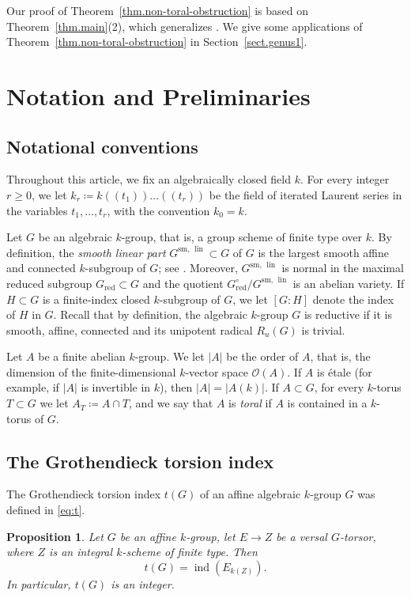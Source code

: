 \documentclass[12pt]{amsart}
\numberwithin{equation}{section}
\newtheorem{proposition}[theorem]{Proposition}
\theoremstyle{remark}
\newcommand{\lin}{\operatorname{lin}}
\newcommand{\Glin}{G^{\mathrm{sm}, \, \lin}}
\begin{document}
Our proof of Theorem~\ref{thm.non-toral-obstruction} is based on Theorem~\ref{thm.main}(2), which generalizes \cite[Proposition 2.1]{genus1}. We give some applications of Theorem~\ref{thm.non-toral-obstruction} in Section~\ref{sect.genus1}.


\section{Notation and Preliminaries}
\label{sect.prelim} 

\subsection{Notational conventions}
\label{subsect.notation}
Throughout this article, we fix an algebraically closed field $k$. For every integer $r\geqslant 0$, we let $k_r \coloneqq k(\!(t_1)\!)\dots (\!(t_r)\!)$ be the field of iterated Laurent series in the variables $t_1, \ldots, t_r$, with the convention $k_0=k$.

Let $G$ be an algebraic $k$-group, that is, a group scheme of finite type over $k$. By definition, the \emph{smooth linear part} $\Glin\subset G$ of $G$ is the largest smooth affine and connected $k$-subgroup of $G$; see \cite[Section 2.1]{bouthier2025generically}. Moreover, $\Glin$ is normal in the maximal reduced subgroup $G_{\mathrm{red}} \subset G$ and the quotient $G_{\mathrm{red}}^{\circ}/\Glin$ is an abelian variety. If $H\subset G$ is a finite-index closed $k$-subgroup of $G$, we let $[G:H]$ denote the index of $H$ in $G$. Recall that by definition, the algebraic $k$-group $G$ is reductive if it is smooth, affine, connected and its unipotent radical $R_u(G)$ is trivial.

Let $A$ be a finite abelian $k$-group.  We let $|A|$ be the order of $A$, that is, the dimension of the finite-dimensional $k$-vector space $\mathcal{O}(A)$. If $A$ is \'etale (for example, if $|A|$ is invertible in $k$), then $|A|=|A(k)|$. If $A\subset G$, for every $k$-torus $T\subset G$ we let $A_T\coloneqq A\cap T$, and we say that $A$ is \emph{toral} if $A$ is contained in a $k$-torus of $G$.


 \subsection{The Grothendieck torsion index}
The Grothendieck torsion index $t(G)$ of an affine algebraic $k$-group $G$ was defined in \eqref{eq:t}.

\begin{proposition} \label{prop:tG-well-defined}
   Let $G$ be an affine $k$-group, let $E \to Z$ be a versal $G$-torsor, where $Z$ is an integral $k$-scheme of finite type. Then
\[t(G) = \operatorname{ind}(E_{k(Z)}).\]
In particular, $t(G)$ is an integer.
\end{proposition}
\end{document}
